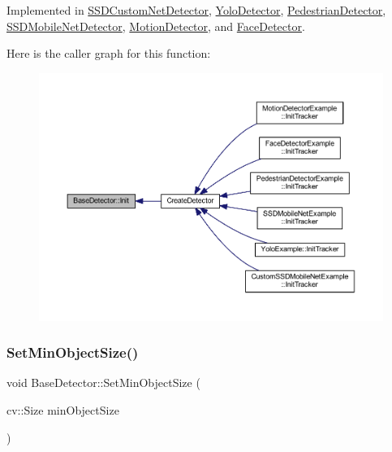 Implemented in \mbox{\hyperlink{class_s_s_d_custom_net_detector_a2f228b0c7bbd679ff310158de119169b}{S\+S\+D\+Custom\+Net\+Detector}}, \mbox{\hyperlink{class_yolo_detector_ac518bc6743145447f19c937c345689c0}{Yolo\+Detector}}, \mbox{\hyperlink{class_pedestrian_detector_a630d8ad4d8ca2123639e989b01c8dd3e}{Pedestrian\+Detector}}, \mbox{\hyperlink{class_s_s_d_mobile_net_detector_a2830cbf9b82b159c25fb2796b867eaef}{S\+S\+D\+Mobile\+Net\+Detector}}, \mbox{\hyperlink{class_motion_detector_af59eda71fe52b578c08472425182dc41}{Motion\+Detector}}, and \mbox{\hyperlink{class_face_detector_ad235988d85ae9c826269e21d5c3c1451}{Face\+Detector}}.

Here is the caller graph for this function\+:\nopagebreak
\begin{figure}[H]
\begin{center}
\leavevmode
\includegraphics[width=350pt]{class_base_detector_a44c53608e9e4e3455ff553d987165260_icgraph}
\end{center}
\end{figure}
\mbox{\label{class_base_detector_ab459f4e77cf1110cc1ee84027f0f2a03}} 
\subsubsection{\texorpdfstring{Set\+Min\+Object\+Size()}{SetMinObjectSize()}}
{\footnotesize\ttfamily void Base\+Detector\+::\+Set\+Min\+Object\+Size (\begin{DoxyParamCaption}\item[{cv\+::\+Size}]{min\+Object\+Size }\end{DoxyParamCaption})\hspace{0.3cm}{\ttfamily [inline]}}



